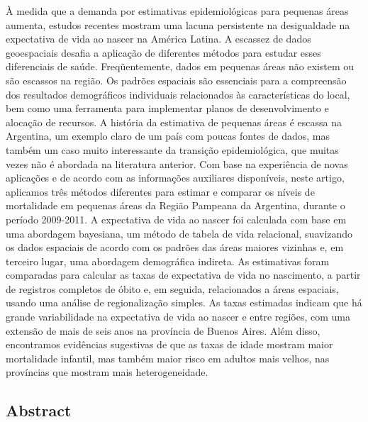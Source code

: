 \documentclass[12pt,]{article}
\begin{document}
À medida que a demanda por estimativas epidemiológicas para pequenas
áreas aumenta, estudos recentes mostram uma lacuna persistente na
desigualdade na expectativa de vida ao nascer na América Latina. A
escassez de dados geoespaciais desafia a aplicação de diferentes métodos
para estudar esses diferenciais de saúde. Freqüentemente, dados em
pequenas áreas não existem ou são escassos na região. Os padrões
espaciais são essenciais para a compreensão dos resultados demográficos
individuais relacionados às características do local, bem como uma
ferramenta para implementar planos de desenvolvimento e alocação de
recursos. A história da estimativa de pequenas áreas é escassa na
Argentina, um exemplo claro de um país com poucas fontes de dados, mas
também um caso muito interessante da transição epidemiológica, que
muitas vezes não é abordada na literatura anterior. Com base na
experiência de novas aplicações e de acordo com as informações
auxiliares disponíveis, neste artigo, aplicamos três métodos diferentes
para estimar e comparar os níveis de mortalidade em pequenas áreas da
Região Pampeana da Argentina, durante o período 2009-2011. A expectativa
de vida ao nascer foi calculada com base em uma abordagem bayesiana, um
método de tabela de vida relacional, suavizando os dados espaciais de
acordo com os padrões das áreas maiores vizinhas e, em terceiro lugar,
uma abordagem demográfica indireta. As estimativas foram comparadas para
calcular as taxas de expectativa de vida no nascimento, a partir de
registros completos de óbito e, em seguida, relacionados a áreas
espaciais, usando uma análise de regionalização simples. As taxas
estimadas indicam que há grande variabilidade na expectativa de vida ao
nascer e entre regiões, com uma extensão de mais de seis anos na
província de Buenos Aires. Além disso, encontramos evidências sugestivas
de que as taxas de idade mostram maior mortalidade infantil, mas também
maior risco em adultos mais velhos, nas províncias que mostram mais
heterogeneidade.

\hypertarget{abstract}{%
\subsection{\texorpdfstring{\textbf{Abstract}}{Abstract}}\label{abstract}}
\end{document}
